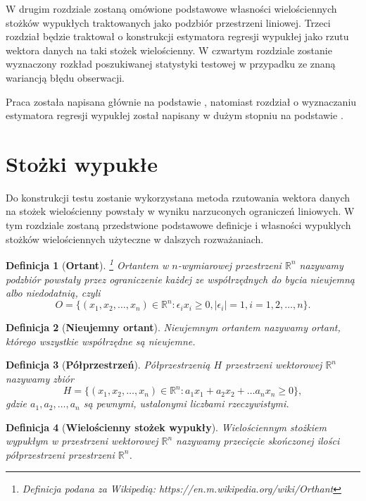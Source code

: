 \documentclass[12pt]{mwart}
\newtheorem{df}{Definicja}
\begin{document}
W drugim rozdziale zostaną omówione podstawowe własności wielościennych stożków wypukłych traktowanych jako podzbiór przestrzeni liniowej. Trzeci rozdział będzie traktował o konstrukcji estymatora regresji wypukłej jako rzutu wektora danych na taki stożek wielościenny. W czwartym rozdziale zostanie wyznaczony rozkład poszukiwanej statystyki testowej w przypadku ze znaną wariancją błędu obserwacji.

Praca została napisana głównie na podstawie \cite{meyer}, natomiast rozdział o wyznaczaniu estymatora regresji wypukłej został napisany w dużym stopniu na podstawie \cite{fraser}.

\section{Stożki wypukłe}
Do konstrukcji testu zostanie wykorzystana metoda rzutowania wektora danych na stożek wielościenny powstały w wyniku narzuconych ograniczeń liniowych. W tym rozdziale zostaną przedstwione podstawowe definicje i własności wypuklych stożków wielościennych użyteczne w dalszych rozważaniach.
\begin{df}[\textbf{Ortant}]\footnote{Definicja podana za Wikipedią: https://en.m.wikipedia.org/wiki/Orthant}
Ortantem w $n$-wymiarowej przestrzeni $\mathbb{R}^n$ nazywamy podzbiór powstały przez ograniczenie każdej ze współrzędnych do bycia nieujemną albo niedodatnią, czyli
\begin{displaymath}
O=\{(x_1,x_2,\dots,x_n)\in \mathbb{R}^n\colon \epsilon_i x_i\geq 0, |\epsilon_i|=1, i=1,2,\dots,n\}.
\end{displaymath}
\end{df}
\begin{df}[\textbf{Nieujemny ortant}]
Nieujemnym ortantem nazywamy ortant, którego wszystkie współrzędne są nieujemne.
\end{df}
\begin{df}[\textbf{Półprzestrzeń}]
Półprzestrzenią $H$ przestrzeni wektorowej $\mathbb{R}^n$ nazywamy zbiór
\begin{displaymath}
H=\{(x_1,x_2,\dots,x_n)\in \mathbb{R}^n\colon a_1 x_1+a_2 x_2+\dots a_n x_n\geq 0\},
\end{displaymath}
gdzie $a_1,a_2,\dots,a_n$ są pewnymi, ustalonymi liczbami rzeczywistymi.\\
\end{df}
\begin{df}[\textbf{Wielościenny stożek wypukły}]
Wielościennym stożkiem wypukłym w przestrzeni wektorowej $\mathbb{R}^n$ nazywamy przecięcie skończonej ilości półprzestrzeni przestrzeni $\mathbb{R}^n$.
\end{df}
\end{document}
